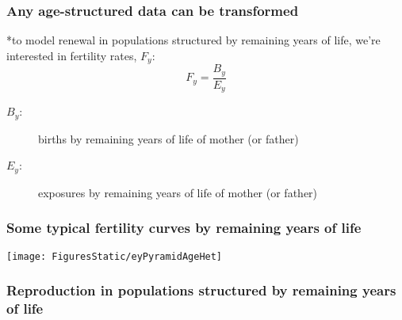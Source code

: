 \documentclass{beamer}
\begin{document}
\begin{frame}
\frametitle{Any age-structured data can be transformed}

*to model renewal in populations structured by remaining years of life, we're
interested in fertility rates, $F_y$:
\begin{equation}
F_y = \frac{B_y}{E_y}
\end{equation}
 \begin{description}
 \item[$B_y$:] births by remaining years of life of mother (or father)
 \item[$E_y$:] exposures by remaining years of life of mother (or father)
 \end{description}
\pause
\end{frame}


\begin{frame}
\frametitle{Some typical fertility curves by remaining years of life}
\texttt{[image: FiguresStatic/eyPyramidAgeHet]}
\end{frame}


\begin{frame}
\frametitle{Reproduction in populations structured by remaining years of life}

\end{frame}

\end{document}
